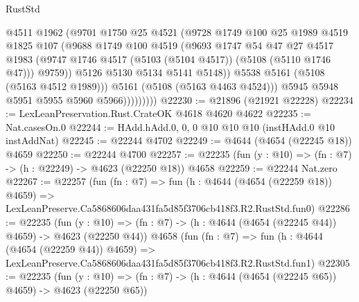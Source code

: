 \begin{lexlean}{RustStd}
\begin{coremodule}
                          @4511
                          @1962
                          (@9701
                            @1750
                            @25
                            @4521
                            (@9728
                              @1749
                              @100
                              @25
                              @1989
                              @4519
                              @1825
                              @107
                              (@9688
                                @1749
                                @100
                                @4519
                                (@9693
                                  @1747
                                  @54
                                  @47
                                  @27
                                  @4517
                                  @1983
                                  (@9747
                                    @1746
                                    @4517
                                    (@5103 (@5104 @4517))
                                    (@5108 (@5110 @1746 @47)))
                                  @9759))
                              @5126
                              @5130
                              @5134
                              @5141
                              @5148))
                          @5538
                          @5161
                          (@5108 (@5163 @4512 @1989)))
                        @5161
                        (@5108 (@5163 @4463 @4524)))
                      @5945
                      @5948
                      @5951
                      @5955
                      @5960
                      @5966)))))))))
@22230 := @21896 (@21921 @22228)
@22234 := LexLeanPreservation.Rust.CrateOK @4618 @4620 @4622
@22235 := Nat.casesOn.{0}
@22244 := HAdd.hAdd.{0, 0, 0} @10 @10 @10 (instHAdd.{0} @10 instAddNat)
@22245 := @22244 @4702
@22249 := @4644 (@4654 (@22245 @18)) @4659
@22250 := @22244 @4700
@22257 := @22235 (fun (y : @10) => (fn : @7) -> (h : @22249) -> @4623 (@22250 @18)) @4658
@22259 := @22244 Nat.zero
@22267 := @22257
    (fun (fn : @7) =>
    fun (h : @4644 (@4654 (@22259 @18)) @4659) =>
    LexLeanPreserve.Ca5868606daa431fa5d85f3706cb418f3.R2.RustStd.fun0)
@22286 := @22235
    (fun (y : @10) => (fn : @7) -> (h : @4644 (@4654 (@22245 @44)) @4659) -> @4623 (@22250 @44))
    @4658
    (fun (fn : @7) =>
    fun (h : @4644 (@4654 (@22259 @44)) @4659) =>
    LexLeanPreserve.Ca5868606daa431fa5d85f3706cb418f3.R2.RustStd.fun1)
@22305 := @22235
    (fun (y : @10) => (fn : @7) -> (h : @4644 (@4654 (@22245 @65)) @4659) -> @4623 (@22250 @65))

\end{coremodule}
\end{lexlean}
